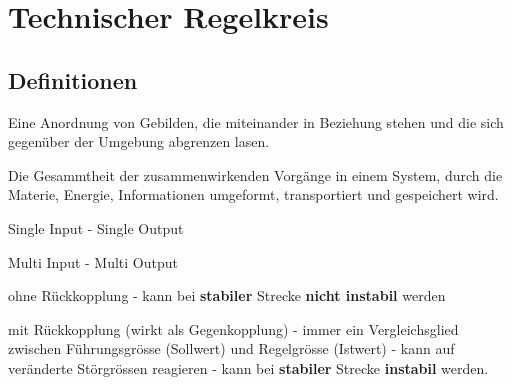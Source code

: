 \section{Technischer Regelkreis}
\subsection{Definitionen}

\begin{description}[leftmargin=2.5cm]
 \item[System] Eine Anordnung von Gebilden, die miteinander in Beziehung stehen
        	   und die sich gegenüber der Umgebung abgrenzen lasen.
 \item[Prozess] Die Gesammtheit der zusammenwirkenden Vorgänge in einem System,
        		durch die Materie, Energie, Informationen umgeformt, transportiert und
        		gespeichert wird.
 \item[SISO] Single Input - Single Output
 \item[MIMO] Multi Input - Multi Output
 \item[Steuerung] ohne Rückkopplung \newline
 				  - kann bei \textbf{stabiler} Strecke \textbf{nicht instabil} werden
 \item[Regelung] mit Rückkopplung (wirkt als Gegenkopplung) \newline
 				 - immer ein Vergleichsglied zwischen Führungsgrösse (Sollwert) und
 				 Regelgrösse (Istwert) \newline
 				 - kann auf veränderte Störgrössen reagieren \newline
 				 - kann bei \textbf{stabiler} Strecke \textbf{instabil} werden.
\end{description}

